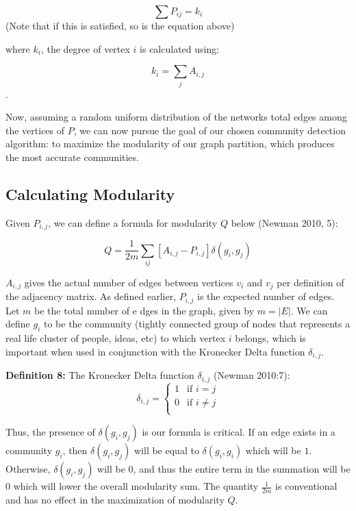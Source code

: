 \documentclass{article}
\begin{document}
\bigskip

$$\sum P_{ij} = k_{i}$$
(Note that if this is satisfied, so is the equation above)

\bigskip

where $k_{i}$, the degree of vertex $i$ is calculated using:

\bigskip

$$k_{i} = \sum_{j} A_{i,j}$$.

\bigskip

\noindent Now, assuming a random uniform distribution of the networks total edges among the vertices of $P$, 
we can now pursue the goal of our chosen community detection algorithm: to maximize the modularity of our graph partition, 
which produces the most accurate communities.

\bigskip

\subsection{Calculating Modularity}
Given $P_{i,j}$, we can define a formula for modularity $Q$ below (Newman 2010, 5):

$$ Q = \dfrac{1}{2m}\sum_{ij} [A_{i,j} - P_{i,j}]\delta (g_i, g_j) $$ 

$A_{i,j}$ gives the actual number of edges between vertices $v_i$ and $v_j$ per definition of the adjacency matrix.
As defined earlier, $P_{i,j}$ is the expected number of edges. 
Let $m$ be the total number of e  dges in the graph, given by $m = |E|$. 
We can define $g_i$ to be the community (tightly connected group of nodes that represents a real life cluster of people, ideas, etc) to which vertex $i$ belongs, which is important when used in conjunction with the Kronecker Delta function $\delta_{i,j}$.

\bigskip

\textbf{Definition 8:} The Kronecker Delta function $\delta_{i, j}$ (Newman 2010:7):  
\[   
\delta_{i,j} = 
     \begin{cases}
       1 & \text{if } i = j \\
       0 & \text{if } i \neq j \\
     \end{cases}
\]

Thus, the presence of $\delta (g_i, g_j)$ is our formula is critical.
If an edge exists in a community $g_i$, then $\delta (g_i, g_j)$ will be equal to $\delta (g_i, g_i)$ which will be $1$.
Otherwise, $\delta (g_i, g_j)$ will be $0$, and thus the entire term in the summation will be $0$ which will lower the overall modularity sum.
The quantity $\frac{1}{2m}$ is conventional and has no effect in the maximization of modularity $Q$.
\end{document}
